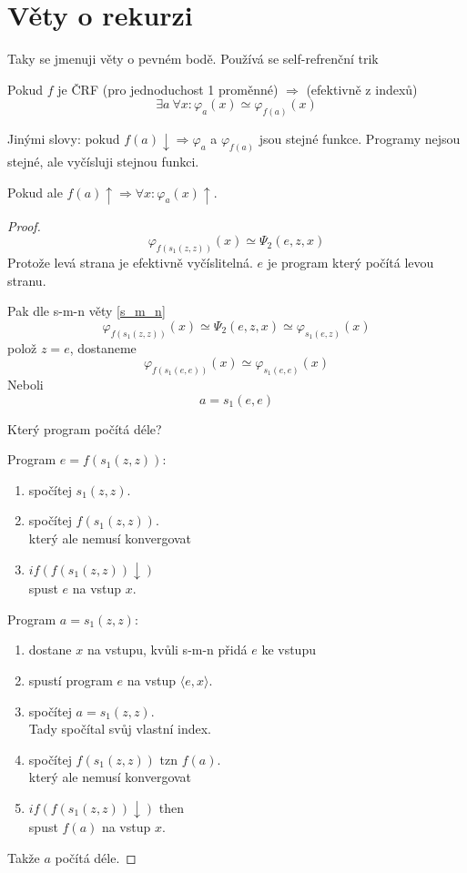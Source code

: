 \section{\texorpdfstring{Věty o rekurzi}{Věty o rekurzi}}
\vspace{5mm}
\large

Taky se jmenuji věty o pevném bodě. Používá se self-refrenční trik

\begin{theorem}[O rekurzi 1]\label{rek_1}
	Pokud $f$ je ČRF (pro jednoduchost 1 proměnné) $\Rightarrow$ (efektivně z indexů)
	\[ \exists a\ \forall x: \varphi_a(x) \simeq \varphi_{f(a)} (x) \]

	Jinými slovy: pokud $f(a) \downarrow \Rightarrow \varphi_a$ a $\varphi_{f(a)}$ jsou stejné funkce.
	Programy nejsou stejné, ale vyčísluji stejnou funkci.

	Pokud ale $f(a) \uparrow \Rightarrow \forall x: \varphi_a(x) \uparrow$.
\end{theorem}
\begin{proof}
	\[ \varphi_{f(s_1(z, z))} (x) \simeq \Psi_2(e, z, x) \]
	Protože levá strana je efektivně vyčíslitelná. $e$ je program který počítá levou stranu.

	Pak dle s-m-n věty \cref{s_m_n}
	\[ \varphi_{f(s_1(z, z))} (x) \simeq \Psi_2(e, z, x) \simeq \varphi_{s_1(e, z)} (x) \]
	polož $z = e$, dostaneme
	\[ \varphi_{f(s_1(e, e))} (x) \simeq \varphi_{s_1(e, e)} (x) \]
	Neboli
	\[ a = s_1(e, e) \]


	Který program počítá déle?

	Program $e = f(s_1(z, z))$:
	\begin{enumerate}
		\item spočítej $s_1(z, z)$.
		\item spočítej $f(s_1(z, z))$.\\
			který ale nemusí konvergovat
		\item $if(f(s_1(z, z)) \downarrow)$\\
			spust $e$ na vstup $x$.
	\end{enumerate}

	Program $a = s_1(z, z)$:
	\begin{enumerate}
		\item dostane $x$ na vstupu, kvůli s-m-n přidá $e$ ke vstupu
		\item spustí program $e$ na vstup $\langle e, x \rangle$.
		\item spočítej $a = s_1(z, z)$.\\
			Tady spočítal svůj vlastní index.
		\item spočítej $f(s_1(z, z))$ tzn $f(a)$.\\
			který ale nemusí konvergovat
		\item $if(f(s_1(z, z)) \downarrow)$ then \\
			spust $f(a)$ na vstup $x$.
	\end{enumerate}

	Takže $a$ počítá déle.
\end{proof}

